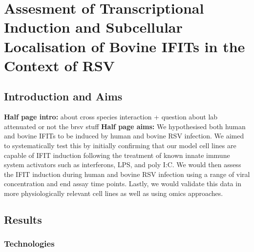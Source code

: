 \chapter{Assesment of Transcriptional Induction and Subcellular Localisation of Bovine IFITs in the Context of RSV} \label{Assesment of Transcriptional Induction and Subcellular Localisation of Bovine IFITs in the Context of RSV}
\section{Introduction and Aims} \label{Introduction and Aims Chapter2}
\textbf{Half page intro:}
about cross species interaction + question about lab attenuated or not the brsv stuff
\textbf{Half page aims:}
We hypothesised both human and bovine IFITs to be induced by human and bovine RSV infection. We aimed to systematically test this by initially confirming that our model cell lines are capable of IFIT induction following the treatment of known innate immune system activators such as interferons, LPS, and poly I:C. We would then assess the IFIT induction during human and bovine RSV infection using a range of viral concentration and end assay time points. Lastly, we would validate this data in more physiologically relevant cell lines as well as using omics approaches.

\section{Results} \label{Results Chapter2}
\subsection{Technologies} \label{Technologies}
